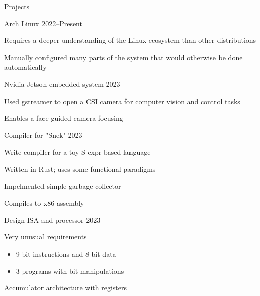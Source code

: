 	
	\begin{rSection}{Projects}

		{\smallskip} %

		\begin{multicols}{2}
		

			\begin{rSubsection}{Arch Linux} {} {2022--Present}
				\item Requires a deeper understanding of the Linux ecosystem than other distributions
				\item Manually configured many parts of the system that would otherwise be done automatically
			\end{rSubsection}

			\begin{rSubsection}{Nvidia Jetson embedded system} {} {2023}
				\item Used gstreamer to open a CSI camera for computer vision and control tasks
				\item Enables a face-guided camera focusing
			\end{rSubsection}

			\begin{rSubsection}{Compiler for "Snek"} {} {2023}
				\item Write compiler for a toy S-expr based language
				\item Written in Rust; uses some functional paradigms
				\item Impelmented simple garbage collector
				\item Compiles to x86 assembly
			\end{rSubsection}

			\begin{rSubsection}{Design ISA and processor} {} {2023}
				\item Very unusual requirements
				\begin{itemize}
					\item 9 bit instructions and 8 bit data
					\item 3 programs with bit manipulations
				\end{itemize}
				\item Accumulator architecture with registers
			\end{rSubsection}


\end{multicols}
\end{rSection}

